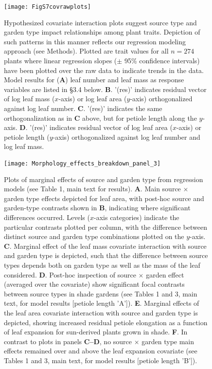 \documentclass[11pt, oneside]{amsart}
\begin{document}
\begin{figure}[!h]
\centering
\texttt{[image: FigS7covrawplots]}
\caption{Hypothesized covariate interaction plots suggest source type and garden type impact relationships among plant traits. Depiction of such patterns in this manner reflects our regression modeling approach (see Methods). Plotted are trait values for all $n=274$ plants where linear regression slopes ($\pm$ 95\% confidence intervals) have been plotted over the raw data to indicate trends in the data. Model results for (\textbf{A}) leaf number and leaf mass as response variables are listed in \S 3.4 below. \textbf{B}. '(res)' indicates residual vector of log leaf mass ($x$-axis) or log leaf area ($y$-axis) orthogonalized against log leaf number. \textbf{C}. '(res)' indicates the same orthogonalization as in \textbf{C} above, but for petiole length along the $y$-axis. \textbf{D}. '(res)' indicates residual vector of log leaf area ($x$-axis) or petiole length ($y$-axis) orthogonalized against log leaf number and log leaf mass.}
\label{FigS6}
\end{figure}

\clearpage

\begin{figure}[h]
\centering
\texttt{[image: Morphology\_effects\_breakdown\_panel\_3]}
\caption{Plots of marginal effects of source and garden type from regression models (see Table 1, main text for results). \textbf{A}. Main source $\times$ garden type effects depicted for leaf area, with post-hoc source and garden-type contrasts shown in \textbf{B}, indicating where significant differences occurred. Levels ($x$-axis categories) indicate the particular contrasts plotted per column, with the difference between distinct source and garden type combinations plotted on the $y$-axis. \textbf{C}. Marginal effect of the leaf mass covariate interaction with source and garden type is depicted, such that the difference between source types depends both on garden type as well as the mass of the leaf considered. \textbf{D}. Post-hoc inspection of source $\times$ garden effect (averaged over the covariate) show significant focal contrasts between source types in shade gardens (see Tables 1 and 3, main text, for model results [petiole length 'A']). \textbf{E}. Marginal effects of the leaf area covariate interaction with source and garden type is depicted, showing increased residual petiole elongation as a function of leaf expansion for sun-derived plants grown in shade. \textbf{F}. In contrast to plots in panels \textbf{C--D}, no source $\times$ garden type main effects remained over and above the leaf expansion covariate (see Tables 1 and 3, main text, for model results [petiole length 'B']).}
\label{FigS7}
\end{figure}
\end{document}
